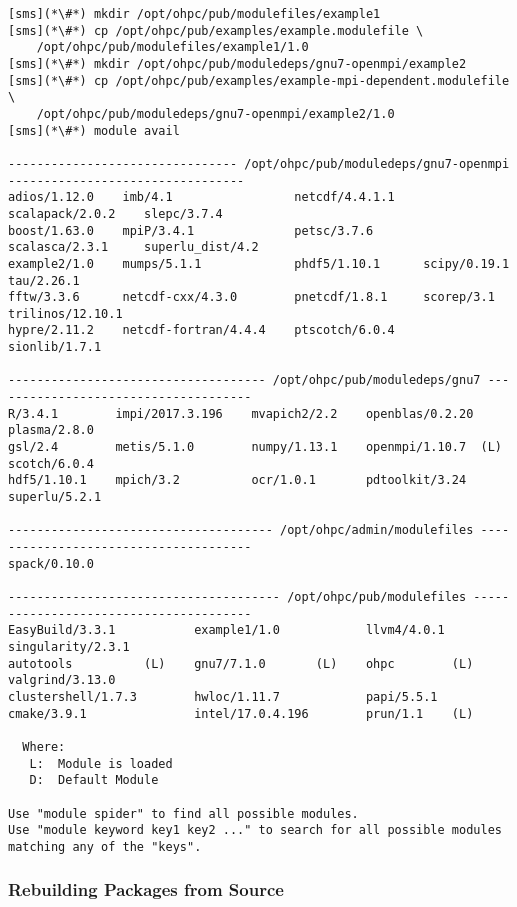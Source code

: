 \begin{lstlisting}[alsoletter={/,.},morekeywords={example1/1.0, example2/1.0}]
[sms](*\#*) mkdir /opt/ohpc/pub/modulefiles/example1
[sms](*\#*) cp /opt/ohpc/pub/examples/example.modulefile \
    /opt/ohpc/pub/modulefiles/example1/1.0
[sms](*\#*) mkdir /opt/ohpc/pub/moduledeps/gnu7-openmpi/example2
[sms](*\#*) cp /opt/ohpc/pub/examples/example-mpi-dependent.modulefile \
    /opt/ohpc/pub/moduledeps/gnu7-openmpi/example2/1.0
[sms](*\#*) module avail

-------------------------------- /opt/ohpc/pub/moduledeps/gnu7-openmpi ---------------------------------
adios/1.12.0    imb/4.1                 netcdf/4.4.1.1    scalapack/2.0.2    slepc/3.7.4
boost/1.63.0    mpiP/3.4.1              petsc/3.7.6       scalasca/2.3.1     superlu_dist/4.2
example2/1.0    mumps/5.1.1             phdf5/1.10.1      scipy/0.19.1       tau/2.26.1
fftw/3.3.6      netcdf-cxx/4.3.0        pnetcdf/1.8.1     scorep/3.1         trilinos/12.10.1
hypre/2.11.2    netcdf-fortran/4.4.4    ptscotch/6.0.4    sionlib/1.7.1

------------------------------------ /opt/ohpc/pub/moduledeps/gnu7 -------------------------------------
R/3.4.1        impi/2017.3.196    mvapich2/2.2    openblas/0.2.20        plasma/2.8.0
gsl/2.4        metis/5.1.0        numpy/1.13.1    openmpi/1.10.7  (L)    scotch/6.0.4
hdf5/1.10.1    mpich/3.2          ocr/1.0.1       pdtoolkit/3.24         superlu/5.2.1

------------------------------------- /opt/ohpc/admin/modulefiles --------------------------------------
spack/0.10.0

-------------------------------------- /opt/ohpc/pub/modulefiles ---------------------------------------
EasyBuild/3.3.1           example1/1.0            llvm4/4.0.1        singularity/2.3.1
autotools          (L)    gnu7/7.1.0       (L)    ohpc        (L)    valgrind/3.13.0
clustershell/1.7.3        hwloc/1.11.7            papi/5.5.1
cmake/3.9.1               intel/17.0.4.196        prun/1.1    (L)

  Where:
   L:  Module is loaded
   D:  Default Module

Use "module spider" to find all possible modules.
Use "module keyword key1 key2 ..." to search for all possible modules matching any of the "keys".
\end{lstlisting}

\newpage
\subsubsection{Rebuilding Packages from Source}  \label{appendix:rpmbuild}

